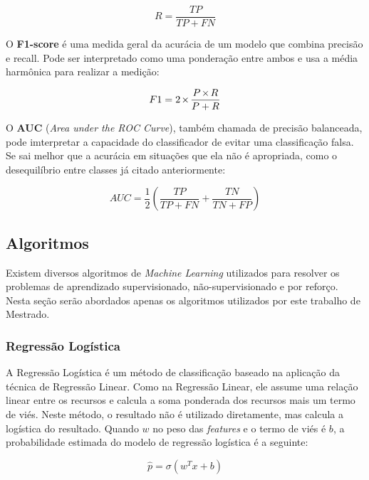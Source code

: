\documentclass[portugues]{ic-tese}
\let\oldtimes\times
\def\times{{\mkern1mu\oldtimes\mkern1mu}}
\begin{document}
\begin{equation}
R = \frac{TP}{TP + FN}
\end{equation}

O \textbf{F1-score} é uma medida geral da acurácia de um modelo que combina precisão e recall. Pode ser interpretado como uma ponderação entre ambos e usa a média harmônica para realizar a medição:

\begin{equation}
F1 = 2 \times\frac{P \times R}{P + R}
\end{equation}

O \textbf{AUC} (\textit{Area under the ROC Curve}), também chamada de precisão balanceada, pode imterpretar a capacidade do classificador de evitar uma classificação falsa. Se sai melhor que a acurácia em situações que ela não é apropriada, como o desequilíbrio entre classes já citado anteriormente:

\begin{equation}
AUC = \frac{1}{2} \left( \frac{TP}{TP + FN} + \frac{TN}{TN + FP} \right)
\end{equation}

\subsection{Algoritmos}

Existem diversos algoritmos de \textit{Machine Learning} utilizados para resolver os problemas de aprendizado supervisionado, não-supervisionado e por reforço. Nesta seção serão abordados apenas os algoritmos utilizados por este trabalho de Mestrado.

\subsubsection{Regressão Logística}

A Regressão Logística é um método de classificação baseado na aplicação da técnica de Regressão Linear. Como na Regressão Linear, ele assume uma relação linear entre os recursos e calcula a soma ponderada dos recursos mais um termo de viés. Neste método, o resultado não é utilizado diretamente, mas calcula a logística do resultado. Quando $w$ no peso das \textit{features} e o termo de viés é $b$, a probabilidade estimada do modelo de regressão logística é a seguinte:

\begin{equation}
\hat{p} = \sigma (w^{T}x + b)
\end{equation}
\end{document}
